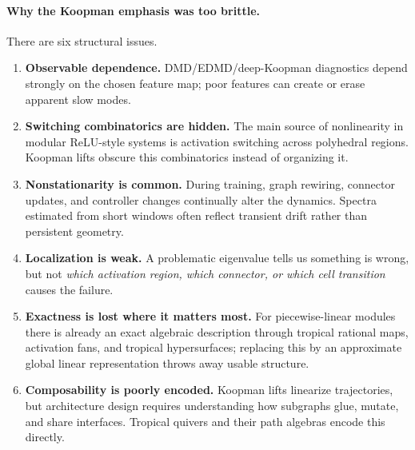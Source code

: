 \documentclass[11pt]{article}
\theoremstyle{definition}
\theoremstyle{plain}
\theoremstyle{remark}
\begin{document}
\paragraph{Why the Koopman emphasis was too brittle.}
There are six structural issues.
\begin{enumerate}[leftmargin=2em]
\item \textbf{Observable dependence.} DMD/EDMD/deep-Koopman diagnostics depend strongly on the chosen feature map; poor features can create or erase apparent slow modes.
\item \textbf{Switching combinatorics are hidden.} The main source of nonlinearity in modular ReLU-style systems is activation switching across polyhedral regions. Koopman lifts obscure this combinatorics instead of organizing it.
\item \textbf{Nonstationarity is common.} During training, graph rewiring, connector updates, and controller changes continually alter the dynamics. Spectra estimated from short windows often reflect transient drift rather than persistent geometry.
\item \textbf{Localization is weak.} A problematic eigenvalue tells us something is wrong, but not \emph{which activation region, which connector, or which cell transition} causes the failure.
\item \textbf{Exactness is lost where it matters most.} For piecewise-linear modules there is already an exact algebraic description through tropical rational maps, activation fans, and tropical hypersurfaces; replacing this by an approximate global linear representation throws away usable structure.
\item \textbf{Composability is poorly encoded.} Koopman lifts linearize trajectories, but architecture design requires understanding how subgraphs glue, mutate, and share interfaces. Tropical quivers and their path algebras encode this directly.
\end{enumerate}
\end{document}
